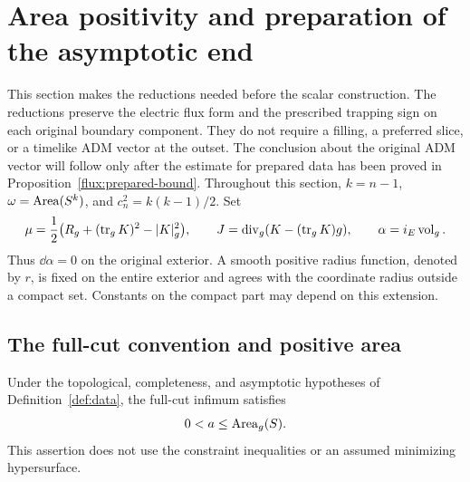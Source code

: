 \section{Area positivity and preparation of the asymptotic end}
\label{prep:section}
\label{sec:preparation}

This section makes the reductions needed before the scalar construction.
The reductions preserve the electric flux form and the prescribed trapping
sign on each original boundary component.  They do not require a filling,
a preferred slice, or a timelike ADM vector at the outset.  The conclusion
about the original ADM vector will follow only after the estimate for
prepared data has been proved in Proposition~\ref{flux:prepared-bound}.
Throughout this section, $k=n-1$, $\omega=\operatorname{Area}(S^k)$, and
$c_n^2=k(k-1)/2$.  Set
\[
 \mu=\frac12\bigl(R_g+(\operatorname{tr}_gK)^2-|K|_g^2\bigr),
 \qquad J=\operatorname{div}_g(K-(\operatorname{tr}_gK)g),
 \qquad \alpha=i_E\operatorname{vol}_g.
\]
Thus $\dd\alpha=0$ on the original exterior.  A smooth positive radius
function, denoted by $r$, is fixed on the entire exterior and agrees with
the coordinate radius outside a compact set.  Constants on the compact
part may depend on this extension.

\subsection{The full-cut convention and positive area}

\begin{lemma}
\label{prep:positive-area}
Under the topological, completeness, and asymptotic hypotheses of
Definition~\ref{def:data}, the full-cut infimum satisfies
\[
 0<a\leq\operatorname{Area}_g(S).
\]
This assertion does not use the constraint inequalities or an assumed
minimizing hypersurface.
\end{lemma}

